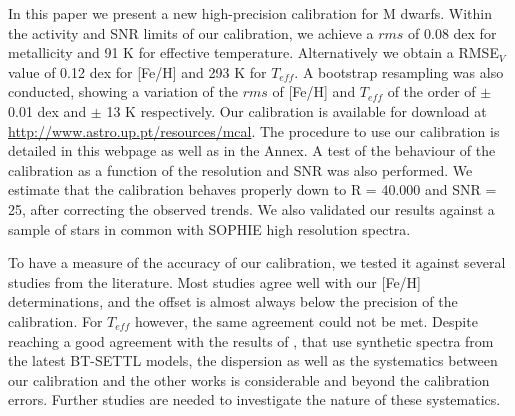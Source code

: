 \documentclass[referee]{aa}
\begin{document}
In this paper we present a new high-precision calibration for M dwarfs. Within the activity and SNR limits of our calibration, we achieve a $rms$ of 0.08 dex for metallicity and 91 K for effective temperature. Alternatively we obtain a RMSE$_{V}$ value of 0.12 dex for [Fe/H] and 293 K for $T_{eff}$. A bootstrap resampling was also conducted, showing a variation of the $rms$ of [Fe/H] and $T_{eff}$ of the order of $\pm$ 0.01 dex and $\pm$ 13 K respectively. Our calibration is available for download at \url{http://www.astro.up.pt/resources/mcal}. The procedure to use our calibration is detailed in this webpage as well as in the Annex. A test of the behaviour of the calibration as a function of the resolution and SNR was also performed. We estimate that the calibration behaves properly down to R = 40.000 and SNR = 25, after correcting the observed trends. We also validated our results against a sample of stars in common with SOPHIE high resolution spectra.


To have a measure of the accuracy of our calibration, we tested it against several studies from the literature. Most studies agree well with our [Fe/H] determinations, and the offset is almost always below the precision of the calibration. For $T_{eff}$ however, the same agreement could not be met. Despite reaching a good agreement with the results of \citet{Rajpurohit-2013a}, that use synthetic spectra from the latest BT-SETTL models, the dispersion as well as the systematics between our calibration and the other works is considerable and beyond the calibration errors. Further studies are needed to investigate the nature of these systematics. 






\end{document}
